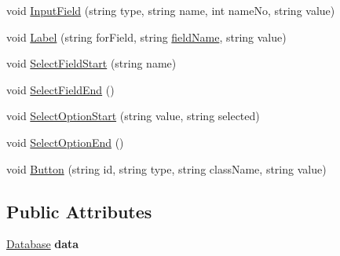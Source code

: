 \begin{DoxyCompactItemize}
\item 
void \hyperlink{classPageStructureMaker_a3547027801e298307527f1e934787b13}{Input\-Field} (string type, string name, int name\-No, string value)
\item 
void \hyperlink{classPageStructureMaker_ae49979cb49bf320cbdf244bce07fbf9e}{Label} (string for\-Field, string \hyperlink{classInputDetail_ac6f85380c5152c406d483726382c4798}{field\-Name}, string value)
\item 
void \hyperlink{classPageStructureMaker_ae8684bb66ca463e2f92e09c96137f9e3}{Select\-Field\-Start} (string name)
\item 
void \hyperlink{classPageStructureMaker_a81eb3cdbc840a4c8165cef87330ade09}{Select\-Field\-End} ()
\item 
void \hyperlink{classPageStructureMaker_a77856078e74dab25329132ea07466f92}{Select\-Option\-Start} (string value, string selected)
\item 
void \hyperlink{classPageStructureMaker_a7682f479f7f1012d426ec9f9535def60}{Select\-Option\-End} ()
\item 
void \hyperlink{classPageStructureMaker_a419feca1cfdb50e1be757eb1c2707a73}{Button} (string id, string type, string class\-Name, string value)
\end{DoxyCompactItemize}
\subsection*{Public Attributes}
\begin{DoxyCompactItemize}
\item 
\hypertarget{classInputDetail_a10827b6d56739ebca7c3526d0b2d0c7d}{\hyperlink{classDatabase}{Database} {\bfseries data}}\label{classInputDetail_a10827b6d56739ebca7c3526d0b2d0c7d}

\end{DoxyCompactItemize}
